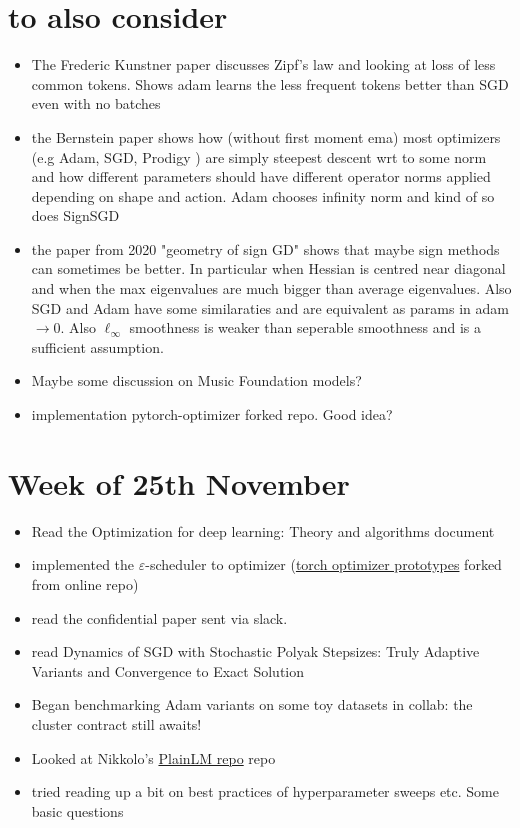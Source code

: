 \documentclass[12pt]{book}
\begin{document}
\section*{to also consider}
\begin{itemize}
\item The Frederic Kunstner paper discusses Zipf's law and looking at loss of less common tokens. Shows adam learns the less frequent tokens better than SGD even with no batches
\item the Bernstein paper shows how (without first moment ema) most optimizers (e.g Adam, SGD, Prodigy ) are simply steepest descent wrt to some norm and how different parameters should have different operator norms applied depending on shape and action. Adam chooses infinity norm and kind of so does SignSGD
\item the paper from 2020 "geometry of sign GD" shows that maybe sign methods can sometimes be better. In particular when Hessian is centred near diagonal and when the max eigenvalues are much bigger than average eigenvalues. Also SGD and Adam have some similaraties and are equivalent as params in adam $\to 0$.  Also $\ell_{\infty}$ smoothness is weaker than seperable smoothness and is a  sufficient assumption. 
\item Maybe some discussion on Music Foundation models?  
\item implementation pytorch-optimizer forked repo. Good idea? 
\end{itemize}



\section*{Week of 25th November}
\begin{itemize}
\item Read the Optimization for deep learning: Theory and algorithms document
\item implemented the $\varepsilon $-scheduler to optimizer (\href{https://github.com/sam-laing/torch_optimizer_prototypes}{torch optimizer prototypes} forked from online repo)
\item read the confidential paper sent via slack. 
\item read Dynamics of SGD with Stochastic Polyak Stepsizes:
Truly Adaptive Variants and Convergence
to Exact Solution
\item Began benchmarking Adam variants on some toy datasets in collab: the cluster contract still awaits!

\item Looked at Nikkolo's \href{https://github.com/Niccolo-Ajroldi/plainLM/tree/main}{PlainLM repo} repo
\item tried reading up a bit on best practices of hyperparameter sweeps etc. Some basic questions 
\end{itemize}
\end{document}

